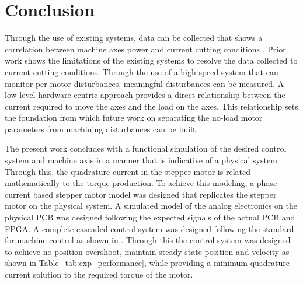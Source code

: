 \chapter{Conclusion}\label{conclusion}
Through the use of existing systems, data can be collected that shows a correlation between machine axes power and current cutting conditions \cite{civiello_characterization_2026}. Prior work shows the limitations of the existing systems to resolve the data collected to current cutting conditions. Through the use of a high speed system that can monitor per motor disturbances, meaningful disturbances can be measured. A low-level hardware centric approach provides a direct relationship between the current required to move the axes and the load on the axes. This relationship sets the foundation from which future work on separating the no-load motor parameters from machining disturbances can be built. 

The present work concludes with a functional simulation of the desired control system and machine axis in a manner that is indicative of a physical system. Through this, the quadrature current in the stepper motor is related mathematically to the torque production. To achieve this modeling, a phase current based stepper motor model was designed that replicates the stepper motor on the physical system. A simulated model of the analog electronics on the physical PCB was designed following the expected signals of the actual PCB and FPGA. A complete cascaded control system was designed following the standard for machine control as shown in \cite{altintas_manufacturing_2012}. Through this the control system was designed to achieve no position overshoot, maintain steady state position and velocity as shown in Table~\ref{tab:exp_performance}, while providing a minimum quadrature current solution to the required torque of the motor. 


